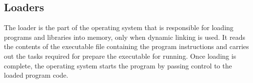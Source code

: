 \documentclass[a4paper,11pt, twocolumn]{article}
\begin{document}
\subsection{Loaders}
The loader is the part of the operating system that is responsible for loading programs and libraries into memory, only when dynamic linking is used. It reads the contents of the executable file containing the program instructions and carries out the tasks required for prepare the executable for running. Once loading is complete, the operating system starts the program by passing control to the loaded program code. 
\end{document}
